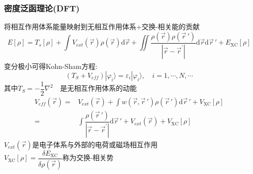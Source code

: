 \documentclass[cjk,slidestop,compress,mathserif,blue]{beamer}
\newcommand{\upcite}[1]{\hspace{0ex}\textsuperscript{\cite{#1}}} %
\begin{document}
\frame                               %
{
\frametitle{密度泛函理论(\textrm{DFT})}
将相互作用体系能量映射到无相互作用体系+交换-相关能的贡献
\begin{displaymath}
	E[\rho]=T_s[\rho]+\int V_{ext}(\vec r)\rho(\vec r)\mathrm{d}\vec r+\iint\dfrac{\rho(\vec r)\rho(\vec r\,')}{|\vec r-\vec r^{\prime}|}\mathrm{d}\vec r\mathrm{d}\vec r\,'+E_{\mathrm{XC}}[\rho]
\end{displaymath}
变分极小可得\textrm{Kohn-Sham}方程\upcite{PR140-A1133_1965}:
$$(T_S+V_{e\!f\!f})|\varphi_i\rangle=\varepsilon_i|\varphi_i\rangle,\quad i=1,\cdots,N,\cdots$$
其中$T_S=-\dfrac12\nabla^2$~~是无相互作用体系的动能
\begin{displaymath}
	\begin{aligned}
		V_{e\!f\!f}(\vec r)=&V_{ext}(\vec r)+\displaystyle\int w(\vec r,\vec r\,')\rho(\vec r\,')\mathrm{d}\vec r\,'+V_{\mathrm{XC}}[\rho]\\
=&\displaystyle\int\dfrac{\rho(\vec r\,')}{|\vec r-\vec r^{\prime}|}\mathrm{d}\vec r\,'+V_{ext}(\vec r)+V_{\mathrm{XC}}[\rho]
	\end{aligned}
\end{displaymath}
$V_{ext}(\vec r)$是电子体系与外部的电荷或磁场相互作用\\
$V_{\mathrm{XC}}[\rho]=\dfrac{\delta E_{\mathrm{XC}}}{\delta\rho(\vec r)}$称为交换-相关势
\vskip 2pt
}
\end{document}
